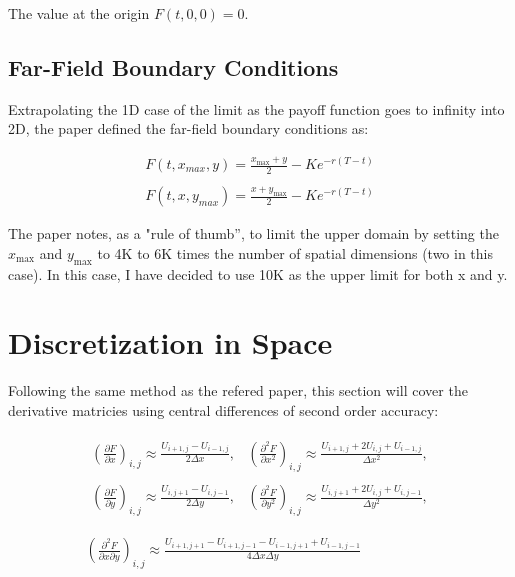 \documentclass[12pt,letterpaper]{article}
\begin{document}
The value at the origin $F(t,0,0) = 0$.


\subsection*{Far-Field Boundary Conditions}
Extrapolating the 1D case of the limit as the payoff function goes to infinity into 2D, the paper defined the far-field boundary conditions as:

\begin{equation*}
\begin{matrix}
    F(t,x_{max},y) = \frac{x_{\text{max}}+y}{2}-Ke^{-r(T-t)}\\
    \\
    F(t,x,y_{max}) = \frac{x+y_{\text{max}}}{2}-Ke^{-r(T-t)}
\end{matrix}
\end{equation*}

The paper notes, as a "rule of thumb”, to limit the upper domain by setting the $x_{\text{max}}$ and $y_{\text{max}}$ to 4K to 6K times the number of spatial dimensions (two in this case).
In this case, I have decided to use 10K as the upper limit for both x and y.

\newpage

\section*{Discretization in Space}

Following the same method as the refered paper, this section will cover the derivative matricies using central differences of second order accuracy:

\begin{equation*}
\begin{matrix}
\begin{matrix}
    \left(\frac{\partial F}{\partial x}\right)_{i,j} \approx \frac{U_{i+1,j}-U_{i-1,j}}{2\Delta x}, & \left(\frac{\partial^2 F}{\partial x^2}\right)_{i,j} \approx \frac{U_{i+1,j}+2U_{i,j}+U_{i-1,j}}{\Delta x^2},\\
    \\
    \left(\frac{\partial F}{\partial y}\right)_{i,j} \approx \frac{U_{i,j+1}-U_{i,j-1}}{2\Delta y}, & \left(\frac{\partial^2 F}{\partial y^2}\right)_{i,j} \approx \frac{U_{i,j+1}+2U_{i,j}+U_{i,j-1}}{\Delta y^2},\\
\end{matrix} 
    \\
    \\
    \left(\frac{\partial^2 F}{\partial x \partial y}\right)_{i,j} \approx \frac{U_{i+1,j+1}-U_{i+1,j-1}-U_{i-1,j+1}+U_{i-1,j-1}}{4\Delta x \Delta y}
\end{matrix}
\end{equation*}
\end{document}
